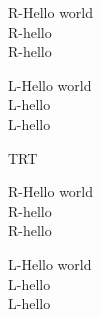 \documentclass{article}
\begin{document}
 \raggedright
   R-Hello world \\
   R-hello\\
   R-hello
  \par

 \raggedleft
  L-Hello world \\
  L-hello\\
  L-hello
  \par
 


 \pardir TRT
 \raggedright
   R-Hello world \\
   R-hello\\
   R-hello
  \par

 \raggedleft
  L-Hello world \\
  L-hello\\
  L-hello
 \par
 
\end{document}
